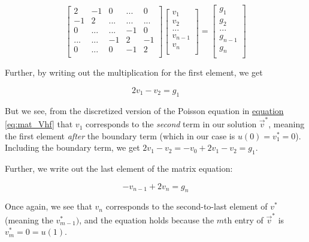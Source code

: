 \documentclass[english,notitlepage]{article}  %
\begin{document}
    \begin{equation}
      \begin{bmatrix}
          2 & -1 & 0 & ... & 0 \\
          -1 & 2 & ... & ... & ... \\
          0 & ... & ... & -1 & 0 \\
          ... & ... & -1 & 2 & -1 \\
          0 & ... & 0 & -1 & 2 \\
      \end{bmatrix} \begin{bmatrix}
          v_1 \\
          v_2 \\
          ... \\
          v_{n-1} \\
          v_n \\
      \end{bmatrix} =
      \begin{bmatrix}
          g_1 \\
          g_2 \\
          ... \\
          g_{n-1} \\
          g_n \\
      \end{bmatrix}
    \end{equation}

    Further, by writing out the multiplication for the first element, we get

    \begin{equation}
      2 v_1 - v_2 = g_1  \label{eqn:v_0}
    \end{equation}

    But we see, from the discretized version of the Poisson equation in \hyperref[eq:mat_Vhf]{equation \ref*{eq:mat_Vhf}} that $v_1$ corresponds to the \emph{second} term in our solution $\vec{v}^*$, meaning the first element \emph{after} the boundary term (which in our case is $u(0) = v^*_1 = 0$). Including the boundary term, we get $2 v_1 - v_2 = -v_{0} + 2 v_1 - v_2 = g_1 $.

    Further, we write out the last element of the matrix equation:

    \begin{equation}
      -v_{n-1} + 2 v_n = g_n \label{eqn:v_n}
    \end{equation}

    Once again, we see that $v_n$ corresponds to the second-to-last element of $v^*$ (meaning the $v^*_{m-1})$, and the equation holds because the $m$th entry of $\vec{v}^*$ is $v^*_m = 0 = u(1)$.
\end{document}
